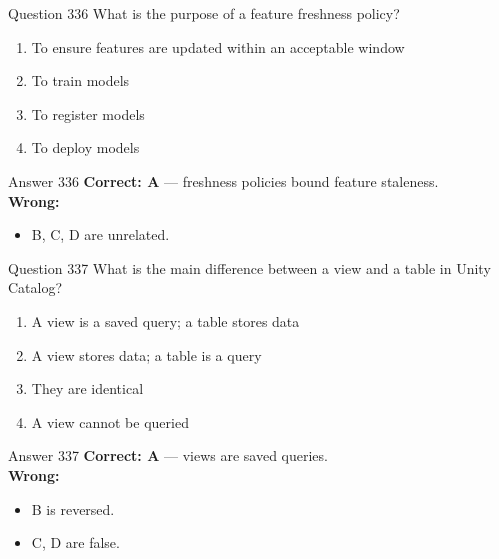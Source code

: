 \documentclass[aspectratio=169,11pt]{beamer}
\begin{document}
	\begin{frame}{Question 336}
		What is the purpose of a feature freshness policy?
		\begin{enumerate}[label=\Alph*.]
			\item To ensure features are updated within an acceptable window
			\item To train models
			\item To register models
			\item To deploy models
		\end{enumerate}
	\end{frame}
	\begin{frame}{Answer 336}
		\textbf{Correct: A} --- freshness policies bound feature staleness.\\
		\vspace{0.5em}
		\textbf{Wrong:}
		\begin{itemize}
			\item B, C, D are unrelated.
		\end{itemize}
	\end{frame}
	
	\begin{frame}{Question 337}
		What is the main difference between a view and a table in Unity Catalog?
		\begin{enumerate}[label=\Alph*.]
			\item A view is a saved query; a table stores data
			\item A view stores data; a table is a query
			\item They are identical
			\item A view cannot be queried
		\end{enumerate}
	\end{frame}
	\begin{frame}{Answer 337}
		\textbf{Correct: A} --- views are saved queries.\\
		\vspace{0.5em}
		\textbf{Wrong:}
		\begin{itemize}
			\item B is reversed.
			\item C, D are false.
		\end{itemize}
	\end{frame}
	
\end{document}
